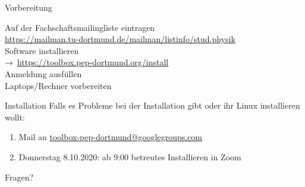 \begin{frame}{Vorbereitung}
  \begin{center}
    \huge
    Auf der Fachschaftsmailingliste eintragen \\
    \url{https://mailman.tu-dortmund.de/mailman/listinfo/stud.physik}\\[0.5\baselineskip]
    Software installieren\\
    →~\textcolor{blue!70!black}{\url{https://toolbox.pep-dortmund.org/install}}\\[0.5\baselineskip]
    Anmeldung ausfüllen\\[0.5\baselineskip]
    Laptops/Rechner vorbereiten%
  \end{center}
\end{frame}
\begin{frame}{Installation}
  \huge
  Falls es Probleme bei der Installation gibt oder ihr Linux installieren wollt:\\[0.5\baselineskip]
  \begin{enumerate}
    \item Mail an \href{mailto:toolbox-pep-dortmund@googlegroups.com}{toolbox-pep-dortmund@googlegroups.com}
    \item Donnerstag 8.10.2020: ab 9:00 betreutes Installieren in Zoom %
  \end{enumerate}
\end{frame}
\begin{frame}
  \Huge\centering
  \textcolor{red!70!black}{Fragen?}
\end{frame}

